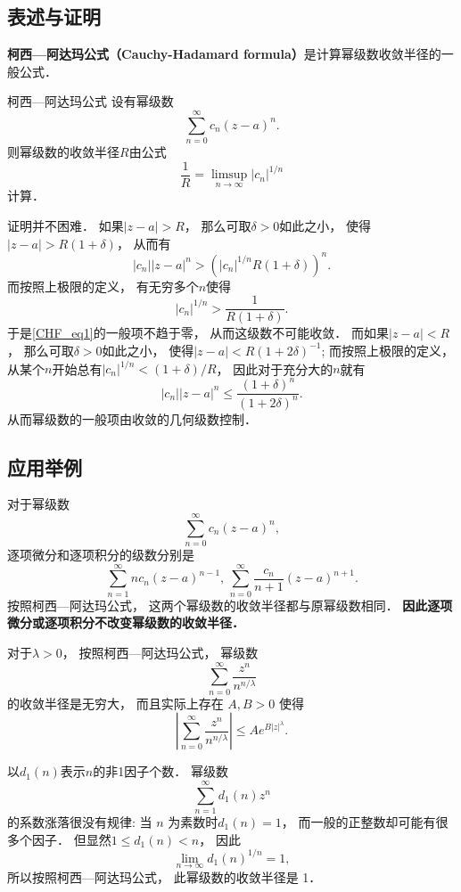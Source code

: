 

\subsection{表述与证明}

\textbf{柯西—阿达玛公式（Cauchy-Hadamard formula）}是计算幂级数收敛半径的一般公式．

\begin{theorem}{柯西—阿达玛公式}
设有幂级数
\begin{equation}\label{CHF_eq1}
\sum_{n=0}^\infty c_n(z-a)^n.
\end{equation}
则幂级数的收敛半径$R$由公式
$$
\frac{1}{R}=\limsup_{n\to\infty}|c_n|^{1/n}
$$
计算．
\end{theorem}
证明并不困难． 如果$|z-a|>R$， 那么可取$\delta>0$如此之小， 使得$|z-a|>R(1+\delta)$， 从而有
$$
|c_n||z-a|^n>(|c_n|^{1/n}R(1+\delta))^n.
$$
而按照上极限的定义， 有无穷多个$n$使得
$$
|c_n|^{1/n}>\frac{1}{R(1+\delta)}.
$$
于是\autoref{CHF_eq1}的一般项不趋于零， 从而这级数不可能收敛． 而如果$|z-a|<R$， 那么可取$\delta>0$如此之小， 使得$|z-a|<R(1+2\delta)^{-1}$; 而按照上极限的定义， 从某个$n$开始总有$|c_n|^{1/n}<(1+\delta)/R$， 因此对于充分大的$n$就有
$$
|c_n||z-a|^n\leq\frac{(1+\delta)^n}{(1+2\delta)^n}.
$$
从而幂级数的一般项由收敛的几何级数控制．

\subsection{应用举例}
对于幂级数
$$
\sum_{n=0}^\infty c_n(z-a)^n,
$$
逐项微分和逐项积分的级数分别是
$$
\sum_{n=1}^\infty nc_n(z-a)^{n-1},\,
\sum_{n=0}^\infty \frac{c_n}{n+1}(z-a)^{n+1}.
$$
按照柯西—阿达玛公式， 这两个幂级数的收敛半径都与原幂级数相同． \textbf{因此逐项微分或逐项积分不改变幂级数的收敛半径．}

对于$\lambda>0$， 按照柯西—阿达玛公式， 幂级数
$$
\sum_{n=0}^\infty\frac{z^n}{n^{n/\lambda}}
$$
的收敛半径是无穷大， 而且实际上存在 $A,B>0$ 使得
$$
\left|\sum_{n=0}^\infty\frac{z^n}{n^{n/\lambda}}\right|
\leq Ae^{B|z|^\lambda}.
$$

以$d_1(n)$表示$n$的非1因子个数． 幂级数
$$
\sum_{n=1}^\infty d_1(n)z^n
$$
的系数涨落很没有规律: 当 $n$ 为素数时$d_1(n)=1$， 而一般的正整数却可能有很多个因子． 但显然$1\leq d_1(n)<n$， 因此
$$
\lim_{n\to\infty}d_1(n)^{1/n}=1,
$$
所以按照柯西—阿达玛公式， 此幂级数的收敛半径是 1．